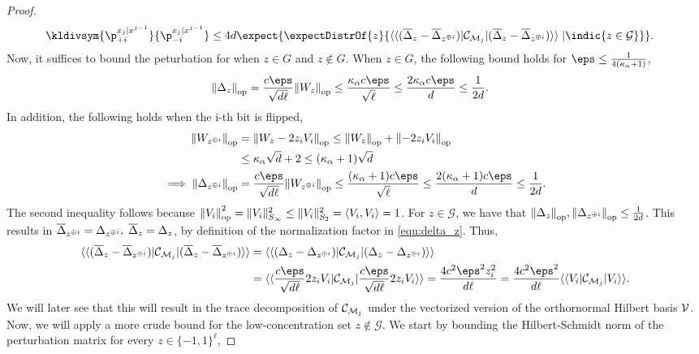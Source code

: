\begin{proof}
\begin{align}
    \kldivsym{\p^{\out_{j}|\out^{j-1}}_{+i}}{\p^{\out_{j}|\out^{j-1}}_{-i}} &\le 4 \dims \expect{\expectDistrOf{z}{\vadj{(\barDelta_{\ptb} - \barDelta_{\ptb ^{\oplus i}})} \Choi_{\POVM_j} \vvec{(\barDelta_{\ptb} - \barDelta_{\ptb ^{\oplus i}})} \;| \indic{z \in \mathcal{G}}}}\label{pf:KL-div-concentration}.
\end{align}
  Now, it suffices to bound the peturbation for when $z \in G$ and $z \notin G$. When $z \in G$, the following bound holds for $\eps \leq \frac{1}{4(\kappa_\alpha+1)}$,
\begin{align}
\opnorm{\Delta_z} &= \frac{c\eps}{\sqrt{\dims \ell}} \opnorm{W_z} \leq  \frac{\kappa_\alpha c\eps}{\sqrt{\ell}} \leq \frac{2 \kappa_\alpha c\eps}{\dims} \leq \frac{1}{2 \dims} .\label{eq:op-norm-bound}
\end{align}
In addition, the following holds when the i-th bit is flipped,
\begin{align*}
        \opnorm{W_{z ^{\oplus i}}} &= \opnorm{W_z - 2 z_i V_i} \leq \opnorm{W_z} + \opnorm{-2 z_i V_i} \\
    &\le \kappa_\alpha \sqrt{\dims} + 2 \leq (\kappa_\alpha + 1) \sqrt{d} \\
    \implies \opnorm{\Delta_{z^{\oplus i}}} &= \frac{c\eps}{\sqrt{\dims \ell}} \opnorm{W_{z^{\oplus i}}} \leq  \frac{(\kappa_\alpha + 1) c\eps}{\sqrt{\ell}} \leq \frac{2(\kappa_\alpha + 1) c\eps}{\dims} \leq \frac{1}{2\dims}.
\end{align*}
The second inequality follows because $ {\left\|V_i\right\|}_{\text{op}}^2 = \|V_i\|_{S_\infty}^2 \leq\|V_i\|_{S_2}^2 = \left\langle V_i,V_i\right\rangle = 1$. For $z \in \mathcal{G}$, we have that ${\left\|\Delta_{z}\right\|}_{\text{op}}, {\left\|\Delta_{z^{\oplus i}}\right\|}_{\text{op}} \leq \frac{1}{2 d}$. This results in ${\overline{\Delta}}_{z ^{\oplus i}} = \Delta_{z ^{\oplus i}}, \;{\overline{\Delta}}_{z} = \Delta_{z}$, by definition of the normalization factor in \cref{equ:delta_z}. Thus,
\begin{align*}
 \vadj{(\barDelta_{z} - \barDelta_{z ^{\oplus i}})} \Choi_{\POVM_j} \vvec{(\barDelta_{z} - \barDelta_{z ^{\oplus i}})} &=  \vadj{(\Delta_{z} - \Delta_{z ^{\oplus i}})}
 \Choi_{\POVM_j} \vvec{(\Delta_{z} - \Delta_{z ^{\oplus i}})} \\
 &=\vadj{\frac{c\eps}{\sqrt{\dims \ell}} 2 z_i V_i}
 \Choi_{\POVM_j}
 \vvec{\frac{c\eps}{\sqrt{\dims \ell}} 2 z_i V_i} = \frac{4 c^2 \eps^2 z_{i}^2}{\dims \ell}  = \frac{4 c^2 \eps^2}{\dims \ell} \vadj{V_i} \Choi_{\POVM_j} \vvec{V_i}.
\end{align*}
We will later see that this will result in the trace decomposition of ${\mathcal{C}}_{\mathcal{M}_j}$ under the vectorized version of the orthornormal Hilbert basis ${\mathcal{V}}$. Now, we will apply a more crude bound for the low-concentration set $z \notin \mathcal{G}$. We start by bounding the Hilbert-Schmidt norm of the perturbation matrix for every $z \in \{-1,1\}^\ell$,

\end{proof}
